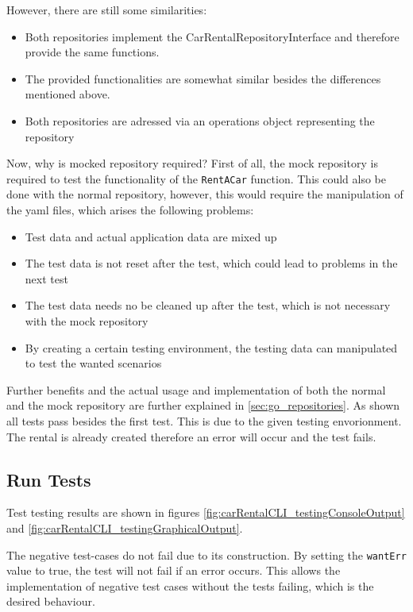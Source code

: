 However, there are still some similarities:
\begin{itemize}
      \item Both repositories implement the CarRentalRepositoryInterface and therefore provide the same functions.
      \item The provided functionalities are somewhat similar besides the differences mentioned above.
      \item Both repositories are adressed via an operations object representing the repository
\end{itemize}

Now, why is mocked repository required?
First of all, the mock repository is required to test the functionality of the \texttt{RentACar} function.
This could also be done with the normal repository, however, this would require the manipulation of the yaml files, which arises the following problems:
\begin{itemize}
      \item Test data and actual application data are mixed up
      \item The test data is not reset after the test, which could lead to problems in the next test
      \item The test data needs no be cleaned up after the test, which is not necessary with the mock repository
      \item By creating a certain testing environment, the testing data can manipulated to test the wanted scenarios
\end{itemize}

Further benefits and the actual usage and implementation of both the normal and the mock repository are further explained in \ref{sec:go_repositories}.
As shown all tests pass besides the first test.
This is due to the given testing envorionment.
The rental is already created therefore an error will occur and the test fails.


\subsection*{Run Tests}
Test testing results are shown in figures \ref*{fig:carRentalCLI_testingConsoleOutput} and \ref*{fig:carRentalCLI_testingGraphicalOutput}.

The negative test-cases do not fail due to its construction.
By setting the \texttt{wantErr} value to true, the test will not fail if an error occurs.
This allows the implementation of negative test cases without the tests failing, which is the desired behaviour.

